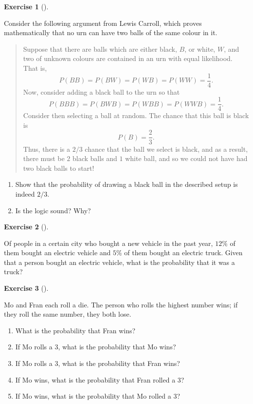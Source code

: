 \documentclass[
  letterpaper,
  DIV=11,
  numbers=noendperiod]{scrreprt}
\providecommand{\tightlist}{%
  \setlength{\itemsep}{0pt}\setlength{\parskip}{0pt}}\usepackage{longtable,booktabs,array}
\theoremstyle{definition}
\newtheorem{exercise}{Exercise}[chapter]
\theoremstyle{definition}
\theoremstyle{definition}
\theoremstyle{remark}
\begin{document}
\begin{exercise}[]\protect\hypertarget{exr-4.4}{}\label{exr-4.4}

Consider the following argument from Lewis Carroll, which proves
mathematically that no urn can have two balls of the same colour in it.

\begin{quote}
Suppose that there are balls which are either black, \(B\), or white,
\(W\), and two of unknown colours are contained in an urn with equal
likelihood. That is, \[P(BB)=P(BW)=P(WB)=P(WW)=\frac{1}{4}.\] Now,
consider adding a black ball to the urn so that
\[P(BBB)=P(BWB)=P(WBB)=P(WWB)=\frac{1}{4}.\] Consider then selecting a
ball at random. The chance that this ball is black is
\[P(B) = \frac{2}{3}.\] Thus, there is a \(2/3\) chance that the ball we
select is black, and as a result, there must be \(2\) black balls and
\(1\) white ball, and so we could not have had two black balls to start!
\end{quote}

\begin{enumerate}
\def\labelenumi{\alph{enumi}.}
\tightlist
\item
  Show that the probability of drawing a black ball in the described
  setup is indeed \(2/3\).
\item
  Is the logic sound? Why?
\end{enumerate}

\end{exercise}

\begin{exercise}[]\protect\hypertarget{exr-4.5}{}\label{exr-4.5}

Of people in a certain city who bought a new vehicle in the past year,
\(12\%\) of them bought an electric vehicle and \(5\%\) of them bought
an electric truck. Given that a person bought an electric vehicle, what
is the probability that it was a truck?

\end{exercise}

\begin{exercise}[]\protect\hypertarget{exr-4.6}{}\label{exr-4.6}

Mo and Fran each roll a die. The person who rolls the highest number
wins; if they roll the same number, they both lose.

\begin{enumerate}
\def\labelenumi{\alph{enumi}.}
\tightlist
\item
  What is the probability that Fran wins?
\item
  If Mo rolls a \(3\), what is the probability that Mo wins?
\item
  If Mo rolls a \(3\), what is the probability that Fran wins?
\item
  If Mo wins, what is the probability that Fran rolled a \(3\)?
\item
  If Mo wins, what is the probability that Mo rolled a \(3\)?
\end{enumerate}

\end{exercise}
\end{document}
